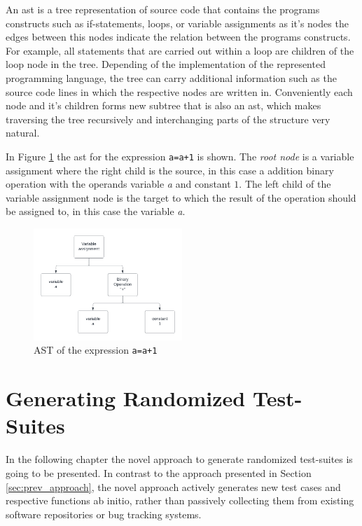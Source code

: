 \documentclass[
fancyheadings, %
%
%
]{stsreprt}
\begin{document}
An \acrshort{ast} is a tree representation of source code that contains the programs constructs such as if-statements, loops, or variable assignments as it's nodes the edges between this nodes indicate the relation between the programs constructs. 
For example, all statements that are carried out within a loop are children of the loop node in the tree. 
Depending of the implementation of the represented programming language, the tree can carry additional information such as the source code lines in which the respective nodes are written in. 
Conveniently each node and it's children forms new subtree that is also an \acrshort{ast}, which makes traversing the tree recursively and interchanging parts of the structure very natural.\par

In Figure \ref{fig:simple_ast} the \acrshort{ast} for the expression \lstinline{a=a+1} is shown. 
The \textit{root node} is a variable assignment where the right child is the source, in this case a addition binary operation with the operands variable \textit{a} and constant $1$. 
The left child of the variable assignment node is the target to which the result of the operation should be assigned to, in this case the variable \textit{a}.

\begin{figure}[h]
    \centering
    \includegraphics[width=0.5\textwidth]{img/simple_ast.png}
    \caption{AST of the expression  \lstinline{a=a+1}}
    \label{fig:simple_ast}
\end{figure}


\chapter{Generating Randomized Test-Suites} \label{ch:approach}
In the following chapter the novel approach to generate randomized test-suites is going to be presented. In contrast to the approach presented in Section \ref{sec:prev_approach}, the novel approach actively generates new test cases and respective functions ab initio, rather than passively collecting them from existing software repositories or bug tracking systems. \par
\end{document}
